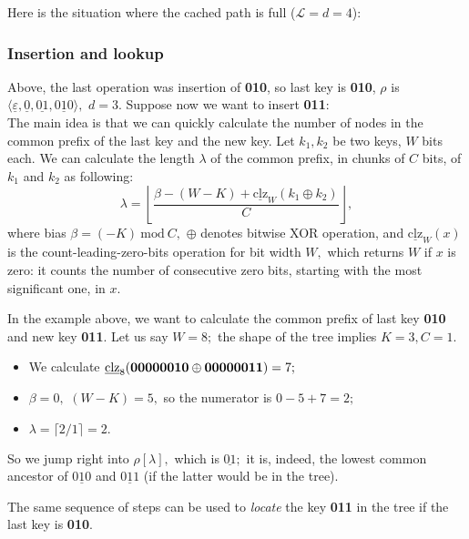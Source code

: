 \documentclass[a4paper,12pt]{article}
\newcommand{\Mod}{\ \mathrm{mod}\ }
\begin{document}
Here is the situation where the cached path is full ($\mathcal{L} = d = 4$):\\


\subsubsection{Insertion and lookup}

Above, the last operation was insertion of \textbf{010}, so last key is \textbf{010}, $\rho$ is $\langle \underline{\varepsilon}, \underline{0}, \underline{01}, \underline{010} \rangle,$
$d = 3.$ Suppose now we want to insert \textbf{011}:\\


The main idea is that we can quickly calculate the number of nodes in the common prefix of the last key and the new key.
Let $k_1, k_2$ be two keys, $W$ bits each. We can calculate the length $\lambda$ of the common prefix, in chunks of $C$ bits, of $k_1$ and $k_2$ as following:
\begin{equation}
    \label{eq:lambdak1k2}
    \lambda = \left\lfloor \frac{\beta - (W - K) + \underline{\mathrm{clz}}_W(k_1 \oplus k_2)}{C} \right\rfloor,
\end{equation}
where bias $\beta = (-K) \Mod C,$ $\oplus$ denotes bitwise XOR operation, and $\underline{\mathrm{clz}}_W(x)$ is the count-leading-zero-bits operation for bit width $W,$
which returns $W$ if $x$ is zero: it counts the number of consecutive zero bits, starting with the most significant one, in $x.$

In the example above, we want to calculate the common prefix of last key \textbf{010} and new key \textbf{011}.
Let us say $W = 8;$ the shape of the tree implies $K = 3, C = 1.$
\begin{itemize}
    \item We calculate $\underline{\mathrm{clz}}_8( \text{\textbf{00000010}} \oplus \text{\textbf{00000011}} ) = 7;$
    \item $\beta = 0,$ $(W - K) = 5,$ so the numerator is $0 - 5 + 7 = 2;$
    \item $\lambda = \lceil 2 / 1 \rceil = 2.$
\end{itemize}
So we jump right into $\rho[\lambda],$ which is $\underline{01};$
it is, indeed, the lowest common ancestor of $\underline{010}$ and $\underline{011}$ (if the latter would be in the tree).

The same sequence of steps can be used to \textit{locate} the key \textbf{011} in the tree if the last key is \textbf{010}.
\end{document}

